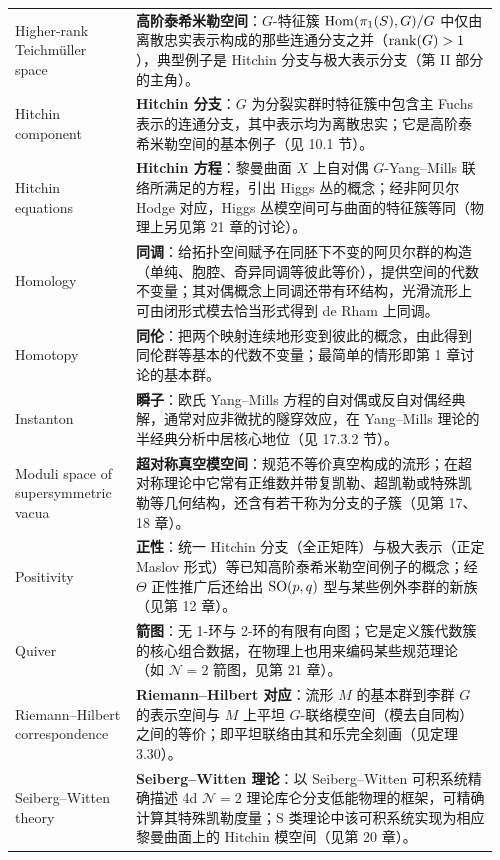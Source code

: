 \begin{longtable}{@{}p{0.24\linewidth}p{0.72\linewidth}@{}}
Higher-rank Teichmüller space & \textbf{高阶泰希米勒空间}：$G$-特征簇 $\operatorname{Hom}(\pi_1(S),G)/G$ 中仅由离散忠实表示构成的那些连通分支之并（$\operatorname{rank}(G)>1$），典型例子是 Hitchin 分支与极大表示分支（第 II 部分的主角）。 \\
Hitchin component & \textbf{Hitchin 分支}：$G$ 为分裂实群时特征簇中包含主 Fuchs 表示的连通分支，其中表示均为离散忠实；它是高阶泰希米勒空间的基本例子（见 10.1 节）。 \\
Hitchin equations & \textbf{Hitchin 方程}：黎曼曲面 $X$ 上自对偶 $G$-Yang–Mills 联络所满足的方程，引出 Higgs 丛的概念；经非阿贝尔 Hodge 对应，Higgs 丛模空间可与曲面的特征簇等同（物理上另见第 21 章的讨论）。 \\
Homology & \textbf{同调}：给拓扑空间赋予在同胚下不变的阿贝尔群的构造（单纯、胞腔、奇异同调等彼此等价），提供空间的代数不变量；其对偶概念上同调还带有环结构，光滑流形上可由闭形式模去恰当形式得到 de Rham 上同调。 \\
Homotopy & \textbf{同伦}：把两个映射连续地形变到彼此的概念，由此得到同伦群等基本的代数不变量；最简单的情形即第 1 章讨论的基本群。 \\
Instanton & \textbf{瞬子}：欧氏 Yang–Mills 方程的自对偶或反自对偶经典解，通常对应非微扰的隧穿效应，在 Yang–Mills 理论的半经典分析中居核心地位（见 17.3.2 节）。 \\
Moduli space of supersymmetric vacua & \textbf{超对称真空模空间}：规范不等价真空构成的流形；在超对称理论中它常有正维数并带复凯勒、超凯勒或特殊凯勒等几何结构，还含有若干称为分支的子簇（见第 17、18 章）。 \\
Positivity & \textbf{正性}：统一 Hitchin 分支（全正矩阵）与极大表示（正定 Maslov 形式）等已知高阶泰希米勒空间例子的概念；经 $\Theta$ 正性推广后还给出 $\operatorname{SO}(p,q)$ 型与某些例外李群的新族（见第 12 章）。 \\
Quiver & \textbf{箭图}：无 1-环与 2-环的有限有向图；它是定义簇代数簇的核心组合数据，在物理上也用来编码某些规范理论（如 $\mathcal{N}=2$ 箭图，见第 21 章）。 \\
Riemann–Hilbert correspondence & \textbf{Riemann–Hilbert 对应}：流形 $M$ 的基本群到李群 $G$ 的表示空间与 $M$ 上平坦 $G$-联络模空间（模去自同构）之间的等价；即平坦联络由其和乐完全刻画（见定理 3.30）。 \\
Seiberg–Witten theory & \textbf{Seiberg–Witten 理论}：以 Seiberg–Witten 可积系统精确描述 4d $\mathcal{N}=2$ 理论库仑分支低能物理的框架，可精确计算其特殊凯勒度量；S 类理论中该可积系统实现为相应黎曼曲面上的 Hitchin 模空间（见第 20 章）。 \\

\end{longtable}
